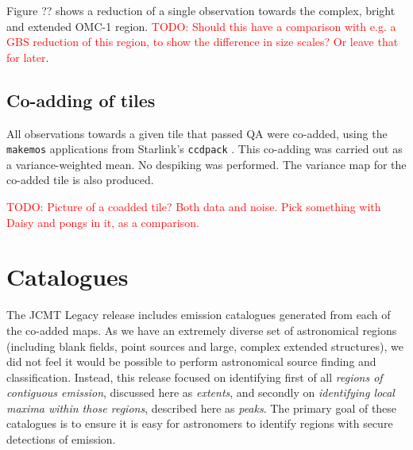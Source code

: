 \documentclass[twocolumn]{aastex6}
\newcommand{\um}{\micron}
\newcommand{\todo}[1]{\textcolor{red}{TODO: #1}}
\newcommand{\ascl}[1]{\href{http://www.ascl.net/#1}{ascl:#1}}
\begin{document}
Figure ?? shows a reduction of a single
observation towards the complex, bright and extended OMC-1
region. \todo{ Should this have a comparison with e.g. a GBS
  reduction of this region, to show the difference in size scales?
Or leave that for later}.



\subsection{Co-adding of tiles}
\label{sec:coadd}
All observations towards a given tile that passed QA were co-added,
using the \texttt{makemos} applications from Starlink's
\texttt{ccdpack} \citep[][\ascl{1403.021}]{SUN139}. This co-adding was
carried out as a variance-weighted mean. No despiking was
performed. The variance map for the co-added tile is also produced.

\todo{Picture of a coadded tile? Both data and noise. Pick something
with Daisy and pongs in it, as a comparison.}


\section{Catalogues}
\label{sec:cat}
The JCMT Legacy release includes emission catalogues generated from
each of the co-added maps. As we have an extremely diverse set of
astronomical regions (including blank fields, point sources and large,
complex extended structures), we did not feel it would be possible to
perform astronomical source finding and classification. Instead, this
release focused on identifying first of all \emph{regions of
  contiguous emission}, discussed here as \emph{extents}, and secondly
on \emph{identifying local maxima within those regions}, described
here as \emph{peaks}. The primary goal of these catalogues is to
ensure it is easy for astronomers to identify regions with secure
detections of emission.
\end{document}
